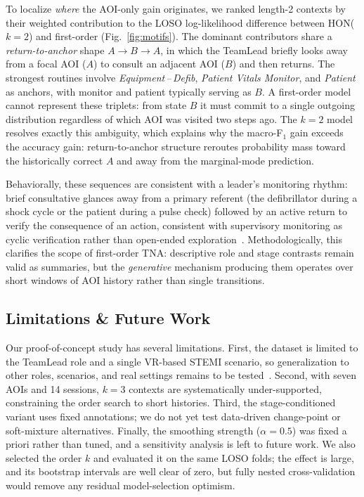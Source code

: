 \documentclass[runningheads]{llncs}
\begin{document}
To localize \emph{where} the AOI-only gain originates, we ranked length-2 contexts by their weighted contribution to the LOSO log-likelihood difference between HON($k{=}2$) and first-order (Fig.~\ref{fig:motifs}). The dominant contributors share a \emph{return-to-anchor} shape $A \rightarrow B \rightarrow A$, in which the TeamLead briefly looks away from a focal AOI ($A$) to consult an adjacent AOI ($B$) and then returns. The strongest routines involve \textit{Equipment\,--\,Defib}, \textit{Patient Vitals Monitor}, and \textit{Patient} as anchors, with monitor and patient typically serving as $B$. A first-order model cannot represent these triplets: from state $B$ it must commit to a single outgoing distribution regardless of which AOI was visited two steps ago. The $k{=}2$ model resolves exactly this ambiguity, which explains why the macro-F$_1$ gain exceeds the accuracy gain: return-to-anchor structure reroutes probability mass toward the historically correct $A$ and away from the marginal-mode prediction.

Behaviorally, these sequences are consistent with a leader's monitoring rhythm: brief consultative glances away from a primary referent (the defibrillator during a shock cycle or the patient during a pulse check) followed by an active return to verify the consequence of an action, consistent with supervisory monitoring as cyclic verification rather than open-ended exploration~\cite{rosenman2016assessing,nallamothu2018resuscitation}. Methodologically, this clarifies the scope of first-order TNA: descriptive role and stage contrasts remain valid as summaries, but the \emph{generative} mechanism producing them operates over short windows of AOI history rather than single transitions.

\subsection{Limitations \& Future Work}

Our proof-of-concept study has several limitations. First, the dataset is limited to the TeamLead role and a single VR-based STEMI scenario, so generalization to other roles, scenarios, and real settings remains to be tested~\cite{kolbe2019laborious}. Second, with seven AOIs and 14 sessions, $k{=}3$ contexts are systematically under-supported, constraining the order search to short histories. Third, the stage-conditioned variant uses fixed annotations; we do not yet test data-driven change-point or soft-mixture alternatives. Finally, the smoothing strength ($\alpha{=}0.5$) was fixed a priori rather than tuned, and a sensitivity analysis is left to future work. We also selected the order $k$ and evaluated it on the same LOSO folds; the effect is large, and its bootstrap intervals are well clear of zero, but fully nested cross-validation would remove any residual model-selection optimism.
\end{document}
